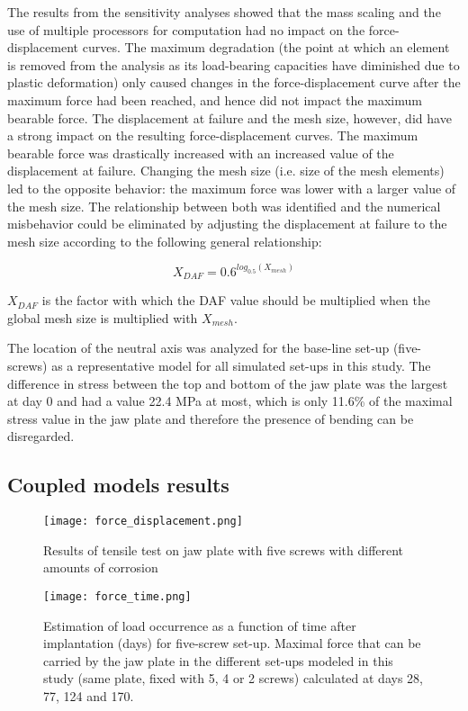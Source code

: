 The results from the sensitivity analyses showed that the mass scaling and the use of multiple processors for computation had no impact on the force-displacement curves. The maximum degradation (the point at which an element is removed from the analysis as its load-bearing capacities have diminished due to plastic deformation) only caused changes in the force-displacement curve after the maximum force had been reached, and hence did not impact the maximum bearable force. The displacement at failure and the mesh size, however, did have a strong impact on the resulting force-displacement curves. The maximum bearable force was drastically increased with an increased value of the displacement at failure. Changing the mesh size (i.e. size of the mesh elements) led to the opposite behavior: the maximum force was lower with a larger value of the mesh size. The relationship between both was identified and the numerical misbehavior could be eliminated by adjusting the displacement at failure to the mesh size according to the following general relationship:

\begin{equation}
X_{DAF}=0.6^{log_{0.5}(X_{mesh})} 
\end{equation}

\noindent $X_{DAF}$ is the factor with which the DAF value should be multiplied when the global mesh size is multiplied with $X_{mesh}$.

The location of the neutral axis was analyzed for the base-line set-up (five-screws) as a representative model for all simulated set-ups in this study. The difference in stress between the top and bottom of the jaw plate was the largest at day 0 and had a value 22.4 MPa at most, which is only 11.6\% of the maximal stress value in the jaw plate and therefore the presence of bending can be disregarded.


\subsection{Coupled models results}

\begin{figure}[h]
    \centering
    \texttt{[image: force\_displacement.png]}
    \caption{Results of tensile test on jaw plate with five screws with different amounts of corrosion}
    \label{fig:forcedisp}
\end{figure}

\begin{figure}[h]
    \centering
    \texttt{[image: force\_time.png]}
    \caption[Estimation of load occurrence as a function of time after implantation for five-screw set-up]{Estimation of load occurrence as a function of time after implantation (days) for five-screw set-up. Maximal force that can be carried by the jaw plate in the different set-ups modeled in this study (same plate, fixed with 5, 4 or 2 screws) calculated at days 28, 77, 124 and 170.}
    \label{fig:forcetime}
\end{figure}

